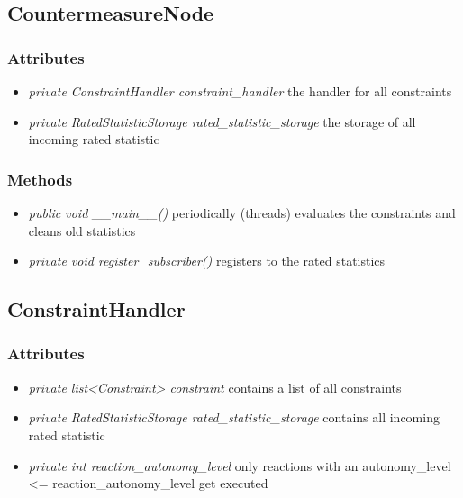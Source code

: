 \subsection{CountermeasureNode}
\subsubsection{Attributes}
\begin{itemize}
	\item \textit{ private ConstraintHandler constraint\_handler}
		the handler for all constraints
	\item \textit{ private RatedStatisticStorage rated\_statistic\_storage}
		the storage of all incoming rated statistic
\end{itemize}
\subsubsection{Methods}
\begin{itemize}
	\item \textit{ public void \_\_main\_\_() }
		periodically (threads) evaluates the constraints and cleans old statistics
	\item \textit{ private void register\_subscriber() }
		registers to the rated statistics
\end{itemize}



\subsection{ConstraintHandler}
\subsubsection{Attributes}
\begin{itemize}
	\item \textit{ private list<Constraint> constraint }
		contains a list of all constraints
	\item \textit{ private  RatedStatisticStorage rated\_statistic\_storage }
		contains all incoming rated statistic
	\item \textit{ private  int reaction\_autonomy\_level }
		only reactions with an autonomy\_level <= reaction\_autonomy\_level get executed
\end{itemize}
